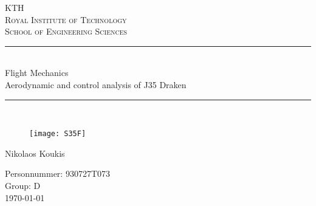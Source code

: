\newcommand{\horrule}[1]{\rule{\linewidth}{#1}} %

\begin{titlepage}

\begin{center}
\normalfont \normalsize 
\textsc{KTH} \\  %
\textsc{Royal Institute of Technology} \\  %
\textsc{School of Engineering Sciences} \\ [25pt] %
\horrule{0.5pt} \\[0.4cm] %
\huge Flight Mechanics \vspace{5mm}\\
Aerodynamic and control analysis of J35 Draken\\ %
\horrule{2pt} \\[0.5cm] %
\vspace*{10mm}

\begin{figure}[H]
    \centering
    \texttt{[image: S35F]}
\end{figure}

\LARGE 
Nikolaos Koukis

\vfill
\normalsize \normalfont
Personnummer: 930727T073\\
Group: D\\
\today
\end{center}
\end{titlepage}
